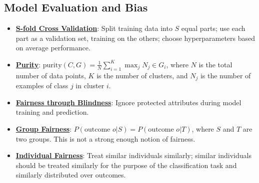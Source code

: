 \documentclass{article}%
\begin{document}
%
\subsection{Model Evaluation and Bias}%
\label{subsec:ModelEvaluationandBias}%
\begin{itemize}[leftmargin=*]%
\item \href{https://purdue.brightspace.com/d2l/common/assets/pdfjs-d2l-dist/1.0.14-legacy/web/viewer.html?file=\%2Fcontent\%2Fenforced\%2F1095467-wl.202510.CS.24300.001\%2F10L1-CrossValidation.pdf\%3Fou\%3D1095467\&lang=en-us\&container=d2l-fileviewer-rendered-pdf\&fullscreen=d2l-fileviewer-rendered-pdf-dialog\&height=667#page=25}{\textbf{S-fold Cross Validation}}: Split training data into $S$ equal parts; use each part as a validation set, training on the others; choose hyperparameters based on average performance.%
\item \href{https://purdue.brightspace.com/d2l/common/assets/pdfjs-d2l-dist/1.0.14-legacy/web/viewer.html?file=\%2Fcontent\%2Fenforced\%2F1095467-wl.202510.CS.24300.001\%2F12L2-distance-clusters.pdf\%3Fou\%3D1095467\&lang=en-us\&container=d2l-fileviewer-rendered-pdf\&fullscreen=d2l-fileviewer-rendered-pdf-dialog\&height=667#page=44}{\textbf{Purity}}: $\text{purity}(C, G) = \frac{1}{N} \sum_{i=1}^{K} \max_j N_j \in G_i$, where $N$ is the total number of data points, $K$ is the number of clusters, and $N_j$ is the number of examples of class $j$ in cluster $i$.%
\item \href{https://purdue.brightspace.com/d2l/common/assets/pdfjs-d2l-dist/1.0.14-legacy/web/viewer.html?file=\%2Fcontent\%2Fenforced\%2F1095467-wl.202510.CS.24300.001\%2F16L2-ethics.pdf\%3Fou\%3D1095467\&lang=en-us\&container=d2l-fileviewer-rendered-pdf\&fullscreen=d2l-fileviewer-rendered-pdf-dialog\&height=667#page=25}{\textbf{Fairness through Blindness}}: Ignore protected attributes during model training and prediction.%
\item \href{https://purdue.brightspace.com/d2l/common/assets/pdfjs-d2l-dist/1.0.14-legacy/web/viewer.html?file=\%2Fcontent\%2Fenforced\%2F1095467-wl.202510.CS.24300.001\%2F16L2-ethics.pdf\%3Fou\%3D1095467\&lang=en-us\&container=d2l-fileviewer-rendered-pdf\&fullscreen=d2l-fileviewer-rendered-pdf-dialog\&height=667#page=26}{\textbf{Group Fairness}}: $P(\text{outcome } o | S) = P(\text{outcome } o | T)$, where $S$ and $T$ are two groups. This is not a strong enough notion of fairness.%
\item \href{https://purdue.brightspace.com/d2l/common/assets/pdfjs-d2l-dist/1.0.14-legacy/web/viewer.html?file=\%2Fcontent\%2Fenforced\%2F1095467-wl.202510.CS.24300.001\%2F16L2-ethics.pdf\%3Fou\%3D1095467\&lang=en-us\&container=d2l-fileviewer-rendered-pdf\&fullscreen=d2l-fileviewer-rendered-pdf-dialog\&height=667#page=27}{\textbf{Individual Fairness}}: Treat similar individuals similarly; similar individuals should be treated similarly for the purpose of the classification task and similarly distributed over outcomes.%

\end{itemize}
\end{document}

